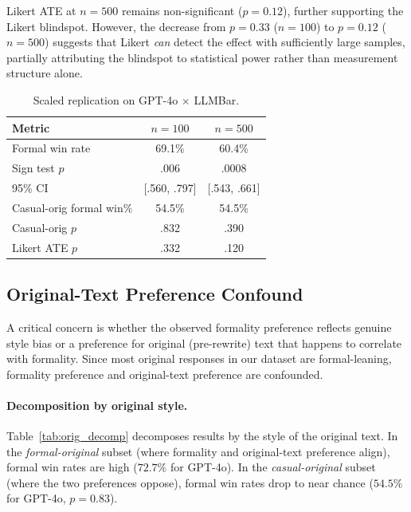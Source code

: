 \documentclass[11pt,a4paper]{article}
\begin{document}
Likert ATE at $n=500$ remains non-significant ($p=0.12$), further supporting the Likert blindspot.
However, the decrease from $p=0.33$ ($n=100$) to $p=0.12$ ($n=500$) suggests that Likert \emph{can} detect the effect with sufficiently large samples, partially attributing the blindspot to statistical power rather than measurement structure alone.

\begin{table}[t]
\centering
\small
\caption{Scaled replication on GPT-4o $\times$ LLMBar.}
\label{tab:scaled}
\begin{tabular}{lcc}
\toprule
\textbf{Metric} & \textbf{$n=100$} & \textbf{$n=500$} \\
\midrule
Formal win rate & 69.1\% & 60.4\% \\
Sign test $p$ & .006 & .0008 \\
95\% CI & [.560, .797] & [.543, .661] \\
Casual-orig formal win\% & 54.5\% & 54.5\% \\
Casual-orig $p$ & .832 & .390 \\
Likert ATE $p$ & .332 & .120 \\
\bottomrule
\end{tabular}
\end{table}

\subsection{Original-Text Preference Confound}
\label{sec:orig_pref}

A critical concern is whether the observed formality preference reflects genuine style bias or a preference for original (pre-rewrite) text that happens to correlate with formality.
Since most original responses in our dataset are formal-leaning, formality preference and original-text preference are confounded.

\paragraph{Decomposition by original style.}
Table~\ref{tab:orig_decomp} decomposes results by the style of the original text.
In the \emph{formal-original} subset (where formality and original-text preference align), formal win rates are high ($72.7\%$ for GPT-4o).
In the \emph{casual-original} subset (where the two preferences oppose), formal win rates drop to near chance ($54.5\%$ for GPT-4o, $p=0.83$).
\end{document}
